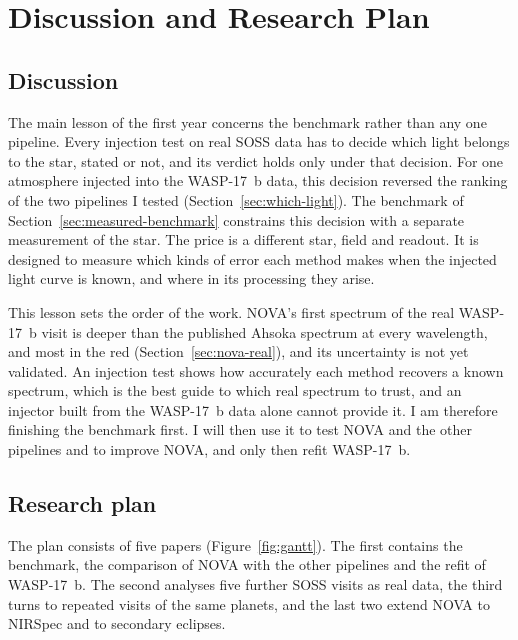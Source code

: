 \section{Discussion and Research Plan}
\label{sec:research-plan}

\subsection{Discussion}
\label{sec:discussion}

The main lesson of the first year concerns the benchmark rather than any one
pipeline. Every injection test on real SOSS data has to decide which light
belongs to the star, stated or not, and its verdict holds only under that
decision. For one atmosphere injected into the WASP-17~b data, this decision
reversed the ranking of the two pipelines I tested
(Section~\ref{sec:which-light}). The benchmark of
Section~\ref{sec:measured-benchmark} constrains this decision with a separate
measurement of the star. The price is a different star, field and readout. It
is designed to measure which kinds of error each method makes when the
injected light curve is known, and where in its processing they arise.

This lesson sets the order of the work. NOVA's first spectrum of the real
WASP-17~b visit is deeper than the published Ahsoka spectrum at every
wavelength, and most in the red (Section~\ref{sec:nova-real}), and its
uncertainty is not yet validated. An injection test shows how accurately each method recovers a known spectrum, which is the best guide to which real spectrum to trust, and an injector built from the WASP-17~b data alone cannot provide it. I am therefore
finishing the benchmark first. I will then use it to test NOVA and the other
pipelines and to improve NOVA, and only then refit WASP-17~b.

\subsection{Research plan}
\label{sec:plan}

The plan consists of five papers (Figure~\ref{fig:gantt}). The first contains
the benchmark, the comparison of NOVA with the other pipelines and the refit
of WASP-17~b. The second analyses five further SOSS visits as real data, the
third turns to repeated visits of the same planets, and the last two extend
NOVA to NIRSpec and to secondary eclipses.

